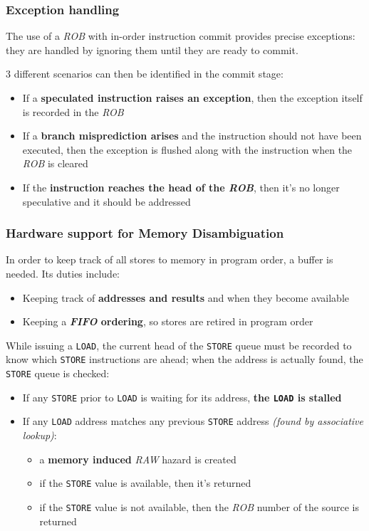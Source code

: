 \documentclass[english]{article}
\begin{document}
\subsubsection{Exception handling}

The use of a \textit{ROB} with in-order instruction commit provides precise exceptions:
they are handled by ignoring them until they are ready to commit.

3 different scenarios can then be identified in the commit stage:

\begin{itemize}
  \item If a \textbf{speculated instruction raises an exception}, then the exception itself is recorded in the \textit{ROB}
  \item If a \textbf{branch misprediction arises} and the instruction should not have been executed, then the exception is flushed along with the instruction when the \textit{ROB} is cleared
  \item If the \textbf{instruction reaches the head of the \textit{ROB}}, then it's no longer speculative and it should be addressed
\end{itemize}

\subsubsection{Hardware support for Memory Disambiguation}

In order to keep track of all stores to memory in program order, a buffer is needed.
Its duties include:

\begin{itemize}
  \item Keeping track of \textbf{addresses and results} and when they become available
  \item Keeping a \textbf{\textit{FIFO} ordering}, so stores are retired in program order
\end{itemize}

While issuing a \texttt{LOAD}, the current head of the \texttt{STORE} queue must be recorded to know which \texttt{STORE} instructions are ahead;
when the address is actually found, the \texttt{STORE} queue is checked:

\begin{itemize}
  \item If any \texttt{STORE} prior to \texttt{LOAD} is waiting for its address, \textbf{the \texttt{LOAD} is stalled}
  \item If any \texttt{LOAD} address matches any previous \texttt{STORE} address \textit{(found by associative lookup)}:
        \begin{itemize}[label=\(\rightarrow\)]
          \item a \textbf{memory induced} \textit{RAW} hazard is created
          \item if the \texttt{STORE} value is available, then it's returned
          \item if the \texttt{STORE} value is not available, then the \textit{ROB} number of the source is returned
        \end{itemize}
\end{itemize}
\end{document}
